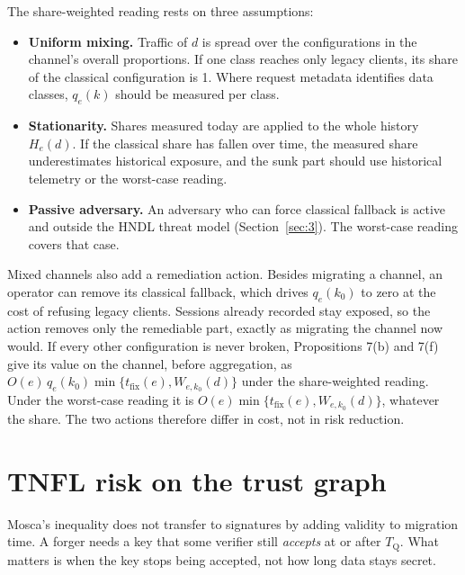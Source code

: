 \documentclass[conference]{IEEEtran}
\newcommand{\Tq}{T_{\mathrm{Q}}}
\newcommand{\tfix}{t_{\mathrm{fix}}}
\begin{document}
The share-weighted reading rests on three assumptions:

\begin{itemize}
\item \textbf{Uniform mixing.} Traffic of $d$ is spread over the configurations in the channel's overall proportions. If one class reaches only legacy clients, its share of the classical configuration is 1. Where request metadata identifies data classes, $q_e(k)$ should be measured per class.
\item \textbf{Stationarity.} Shares measured today are applied to the whole history $H_e(d)$. If the classical share has fallen over time, the measured share underestimates historical exposure, and the sunk part should use historical telemetry or the worst-case reading.
\item \textbf{Passive adversary.} An adversary who can force classical fallback is active and outside the HNDL threat model (Section~\ref{sec:3}). The worst-case reading covers that case.
\end{itemize}

Mixed channels also add a remediation action. Besides migrating a channel, an operator can remove its classical fallback, which drives $q_e(k_0)$ to zero at the cost of refusing legacy clients. Sessions already recorded stay exposed, so the action removes only the remediable part, exactly as migrating the channel now would. If every other configuration is never broken, Propositions 7(b) and 7(f) give its value on the channel, before aggregation, as $O(e)\, q_e(k_0) \min\{\tfix(e), W_{e,k_0}(d)\}$ under the share-weighted reading. Under the worst-case reading it is $O(e) \min\{\tfix(e), W_{e,k_0}(d)\}$, whatever the share. The two actions therefore differ in cost, not in risk reduction.

\section{TNFL risk on the trust graph}\label{sec:7}

Mosca's inequality does not transfer to signatures by adding validity to migration time. A forger needs a key that some verifier still \emph{accepts} at or after $\Tq$. What matters is when the key stops being accepted, not how long data stays secret.
\end{document}
